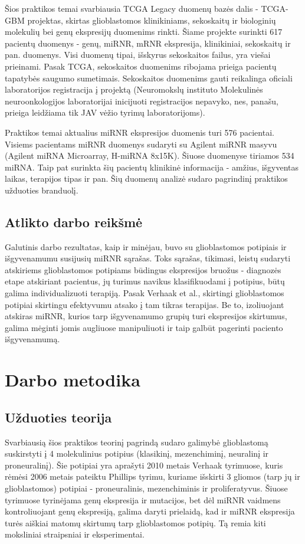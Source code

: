 \documentclass[a4paper,12pt]{article}
\begin{document}
Šios praktikos temai svarbiausia TCGA Legacy duomenų bazės dalis - TCGA-GBM projektas, skirtas glioblastomos klinikiniams, sekoskaitų ir biologinių molekulių bei genų ekspresijų duomenims rinkti. Šiame projekte surinkti 617 pacientų duomenys - genų, miRNR, mRNR ekspresija, klinikiniai, sekoskaitų ir pan. duomenys. Visi duomenų tipai, išskyrus sekoskaitos failus, yra viešai prieinami. Pasak TCGA, sekoskaitos duomenims ribojama prieiga pacientų tapatybės saugumo sumetimais. Sekoskaitos duomenims gauti reikalinga oficiali laboratorijos registracija į projektą (Neuromokslų instituto Molekulinės neuroonkologijos laboratorijai inicijuoti registracijos nepavyko, nes, panašu, prieiga leidžiama tik JAV vėžio tyrimų laboratorijoms).

Praktikos temai aktualius miRNR ekspresijos duomenis turi 576 pacientai. Visiems pacientams miRNR duomenys sudaryti su Agilent miRNR masyvu (Agilent miRNA Microarray, H-miRNA 8x15K)\cite{agilent}. Šiuose duomenyse tiriamos 534 miRNA. Taip pat surinkta šių pacientų klinikinė informacija - amžius, išgyventas laikas, terapijos tipas ir pan. Šių duomenų analizė sudaro pagrindinį praktikos užduoties branduolį.

\subsection{Atlikto darbo reikšmė}
\indent\indent
Galutinis darbo rezultatas, kaip ir minėjau, buvo su glioblastomos potipiais ir išgyvenamumu susijusių miRNR sąrašas. Toks sąrašas, tikimasi, leistų sudaryti atskiriems glioblastomos potipiams būdingus ekspresijos bruožus - diagnozės etape atskiriant pacientus, jų turimus navikus klasifikuodami į potipius, būtų galima individualizuoti terapiją. Pasak Verhaak et al., skirtingi glioblastomos potipiai skirtingu efektyvumu atsako į tam tikras terapijas. Be to, izoliuojant atskiras miRNR, kurios tarp išgyvenamumo grupių turi ekspresijos skirtumus, galima mėginti jomis augliuose manipuliuoti ir taip galbūt pagerinti paciento išgyvenamumą.

\section{Darbo metodika}
\subsection{Užduoties teorija}
\indent\indent
Svarbiausią šios praktikos teorinį pagrindą sudaro galimybė glioblastomą suskirstyti į 4 molekulinius potipius (klasikinį, mezenchiminį, neuralinį ir proneuralinį). Šie potipiai yra aprašyti 2010 metais Verhaak tyrimuose\cite{verhaak}, kuris rėmėsi 2006 metais pateiktu Phillips tyrimu\cite{philips}, kuriame išskirti 3 gliomos (tarp jų ir glioblastomos) potipiai - proneuralinis, mezenchiminis ir proliferatyvus. Šiuose tyrimuose tyrinėjama genų ekspresija ir mutacijos, bet dėl miRNR vaidmens kontroliuojant genų ekspresiją, galima daryti prielaidą, kad ir miRNR ekspresija turės aiškiai matomų skirtumų tarp glioblastomos potipių. Tą remia kiti moksliniai straipsniai ir eksperimentai\cite{godlewski}.
\end{document}
